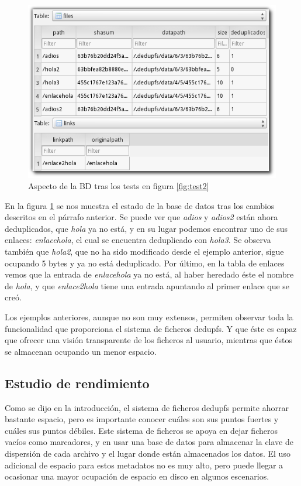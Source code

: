 \documentclass[12pt,a4paper]{article}
\begin{document}
\begin{figure}[h!]
  \centering
  \label{fig:db2}
  \includegraphics[width=.6\linewidth]{imagenes/db2}
  \caption{Aspecto de la BD tras los tests en figura \ref{fig:test2}}
\end{figure}



En la figura \ref{fig:db2} se nos muestra el estado de la base de datos tras los cambios descritos en el párrafo anterior. Se puede ver que \emph{adios} y \emph{adios2} están ahora deduplicados, que \emph{hola} ya no está, y en su lugar podemos encontrar uno de sus enlaces: \emph{enlacehola}, el cual se encuentra deduplicado con \emph{hola3}. Se observa también que \emph{hola2}, que no ha sido modificado desde el ejemplo anterior, sigue ocupando 5 bytes y ya no está deduplicado. Por último, en la tabla de enlaces vemos que la entrada de \emph{enlacehola} ya no está, al haber heredado éste el nombre de \emph{hola}, y que \emph{enlace2hola} tiene una entrada apuntando al primer enlace que se creó.

Los ejemplos anteriores, aunque no son muy extensos, permiten observar toda la funcionalidad que proporciona el sistema de ficheros dedupfs. Y que éste es capaz que ofrecer una visión transparente de los ficheros al usuario, mientras que éstos se almacenan ocupando un menor espacio.

\subsection{Estudio de rendimiento}

Como se dijo en la introducción, el sistema de ficheros dedupfs permite ahorrar bastante espacio, pero es importante conocer cuáles son sus puntos fuertes y cuáles sus puntos débiles. Este sistema de ficheros se apoya en dejar ficheros vacíos como marcadores, y en usar una base de datos para almacenar la clave de dispersión de cada archivo y el lugar donde están almacenados los datos. El uso adicional de espacio para estos metadatos no es muy alto, pero puede llegar a ocasionar una mayor ocupación de espacio en disco en algunos escenarios. 
\end{document}
